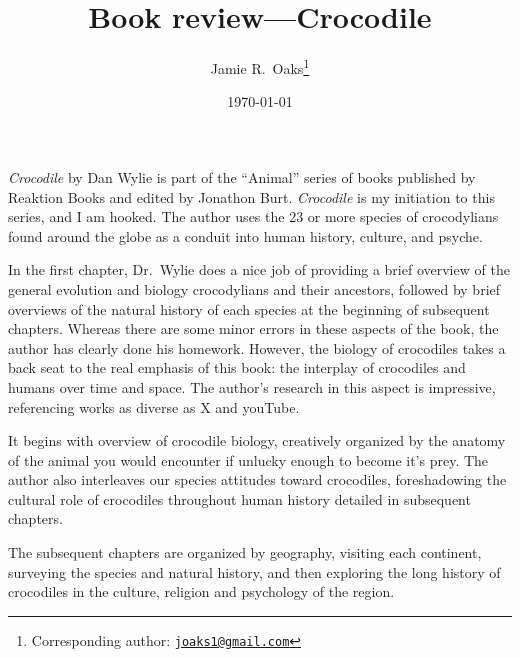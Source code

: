 \documentclass[letterpaper,12pt]{article}
\title{Book review---Crocodile}
\author[1]{Jamie R.\ Oaks\thanks{Corresponding author: \href{mailto:joaks1@gmail.com}{\tt joaks1@gmail.com}}}
\affil[1]{Department of Biology, University of Washington, Seattle, Washington 98195}
\date{\today}
\newcommand{\croc}{\emph{Crocodile}\xspace}
\begin{document}
\maketitle

\newpage
\doublespacing

\croc by Dan Wylie \citep{Wylie2013} is part of the ``Animal'' series of books
published by Reaktion Books and edited by Jonathon Burt.
\croc is my initiation to this series, and I am hooked.
The author uses the 23 or more species of crocodylians found around the globe
as a conduit into human history, culture, and psyche.

In the first chapter, Dr.\ Wylie does a nice job of providing a brief overview
of the general evolution and biology crocodylians and their ancestors, followed
by brief overviews of the natural history of each species at the beginning of
subsequent chapters.
Whereas there are some minor errors in these aspects of the book, the author
has clearly done his homework.
However, the biology of crocodiles takes a back seat to the real emphasis of
this book: the interplay of crocodiles and humans over time and space.
The author's research in this aspect is impressive, referencing works as
diverse as X and youTube.

It begins with overview of crocodile biology, creatively organized by the
anatomy of the animal you would encounter if unlucky enough to become it's
prey.
The author also interleaves our species attitudes toward crocodiles,
foreshadowing the cultural role of crocodiles throughout human history detailed
in subsequent chapters.

The subsequent chapters are organized by geography, visiting each continent,
surveying the species and natural history, and then exploring the long history
of crocodiles in the culture, religion and psychology of the region.



\end{document}
